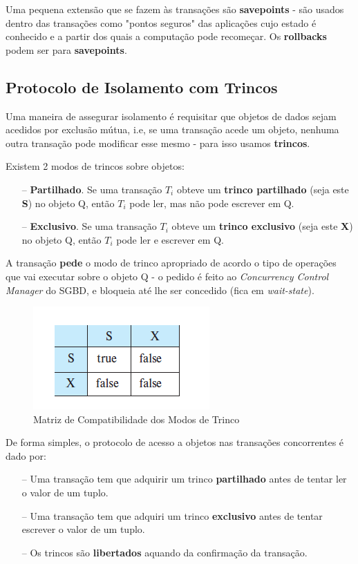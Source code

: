 \documentclass[oneside]{book}
\theoremstyle{definition}
\begin{document}
Uma pequena extensão que se fazem às transações são \textbf{savepoints} - são usados dentro das transações como "pontos seguros" das aplicações cujo estado é conhecido e a partir dos quais a computação pode recomeçar. Os \textbf{rollbacks} podem ser para \textbf{savepoints}.

\subsection{Protocolo de Isolamento com Trincos}
Uma maneira de assegurar isolamento é requisitar que objetos de dados sejam acedidos por exclusão mútua, i.e, se uma transação acede um objeto, nenhuma outra transação pode modificar esse mesmo - para isso usamos \textbf{trincos}.

Existem 2 modos de trincos sobre objetos:
\begin{itemize}
    \itemsep 0cm
    \item[--] \textbf{Partilhado}. Se uma transação $T_i$ obteve um \textbf{trinco partilhado} (seja este \textbf{S}) no objeto Q, então $T_i$ pode ler, mas não pode escrever em Q.
    \item[--] \textbf{Exclusivo}. Se uma transação $T_i$ obteve um \textbf{trinco exclusivo} (seja este \textbf{X}) no objeto Q, então $T_i$ pode ler e escrever em Q.
\end{itemize}
A transação \textbf{pede} o modo de trinco apropriado de acordo o tipo de operações que vai executar sobre o objeto Q - o pedido é feito ao \textit{Concurrency Control Manager} do SGBD, e bloqueia até lhe ser concedido (fica em \textit{wait-state}).

\begin{figure}[H]
    \centering
    \includegraphics[scale=0.45]{cap_transct/matriz_compatibilidade.png}
    \caption{Matriz de Compatibilidade dos Modos de Trinco}
\end{figure}

De forma simples, o protocolo de acesso a objetos nas transações concorrentes é dado por:
\begin{itemize}
    \itemsep 0cm
    \item[--] Uma transação tem que adquirir um trinco \textbf{partilhado} antes de tentar ler o valor de um tuplo.
    \item[--] Uma transação tem que adquiri um trinco \textbf{exclusivo} antes de tentar escrever o valor de um tuplo.
    \item[--] Os trincos são \textbf{libertados} aquando da confirmação da transação.
\end{itemize}
\end{document}
